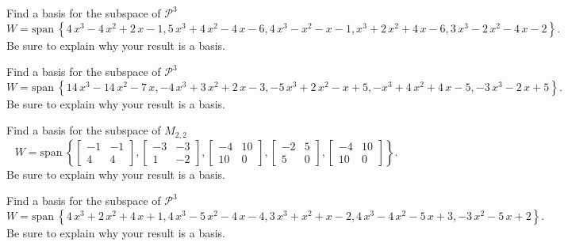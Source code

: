 \documentclass{article}
\begin{document}
\begin{exerciseStatement}
    Find a basis for the subspace of \(\mathcal{P}^3\)
\[W=\mathrm{span}\ \left\{4 \, x^{3} - 4 \, x^{2} + 2 \, x - 1 , 5 \, x^{3} + 4 \, x^{2} - 4 \, x - 6 , 4 \, x^{3} - x^{2} - x - 1 , x^{3} + 2 \, x^{2} + 4 \, x - 6 , 3 \, x^{3} - 2 \, x^{2} - 4 \, x - 2\right\}.\]
 Be sure to explain why your result is a basis.


  
\end{exerciseStatement}

\begin{exerciseStatement}
    Find a basis for the subspace of \(\mathcal{P}^3\)
\[W=\mathrm{span}\ \left\{14 \, x^{3} - 14 \, x^{2} - 7 \, x , -4 \, x^{3} + 3 \, x^{2} + 2 \, x - 3 , -5 \, x^{3} + 2 \, x^{2} - x + 5 , -x^{3} + 4 \, x^{2} + 4 \, x - 5 , -3 \, x^{3} - 2 \, x + 5\right\}.\]
 Be sure to explain why your result is a basis.


  
\end{exerciseStatement}

\begin{exerciseStatement}
    Find a basis for the subspace of \(M_{2,2}\)
\[W=\mathrm{span}\ \left\{\left[\begin{array}{cc}
-1 & -1 \\
4 & 4
\end{array}\right] , \left[\begin{array}{cc}
-3 & -3 \\
1 & -2
\end{array}\right] , \left[\begin{array}{cc}
-4 & 10 \\
10 & 0
\end{array}\right] , \left[\begin{array}{cc}
-2 & 5 \\
5 & 0
\end{array}\right] , \left[\begin{array}{cc}
-4 & 10 \\
10 & 0
\end{array}\right]\right\}.\]
 Be sure to explain why your result is a basis.


  
\end{exerciseStatement}

\begin{exerciseStatement}
    Find a basis for the subspace of \(\mathcal{P}^3\)
\[W=\mathrm{span}\ \left\{4 \, x^{3} + 2 \, x^{2} + 4 \, x + 1 , 4 \, x^{3} - 5 \, x^{2} - 4 \, x - 4 , 3 \, x^{3} + x^{2} + x - 2 , 4 \, x^{3} - 4 \, x^{2} - 5 \, x + 3 , -3 \, x^{2} - 5 \, x + 2\right\}.\]
 Be sure to explain why your result is a basis.


  
\end{exerciseStatement}
\end{document}
